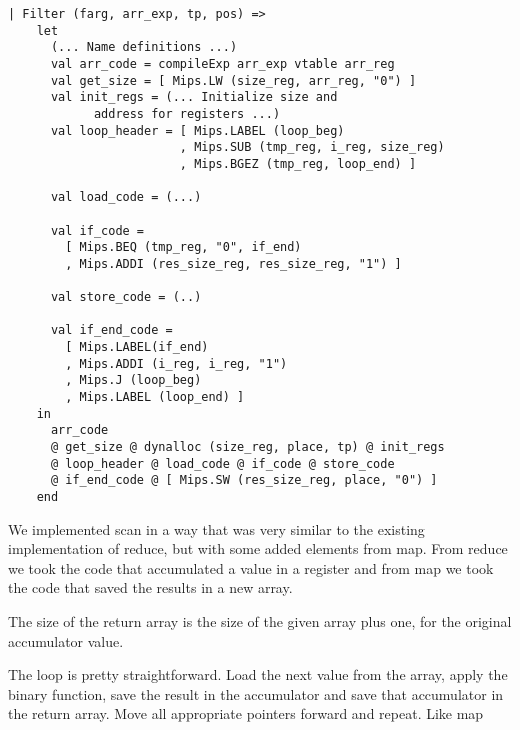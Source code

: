 \documentclass[10pt]{article}
\begin{document}
\begin{Verbatim}[frame=single]
  | Filter (farg, arr_exp, tp, pos) =>
    let
      (... Name definitions ...)
      val arr_code = compileExp arr_exp vtable arr_reg
      val get_size = [ Mips.LW (size_reg, arr_reg, "0") ]
      val init_regs = (... Initialize size and 
      		address for registers ...)
      val loop_header = [ Mips.LABEL (loop_beg)
                        , Mips.SUB (tmp_reg, i_reg, size_reg)
                        , Mips.BGEZ (tmp_reg, loop_end) ]
  
      val load_code = (...)
  
      val if_code =
        [ Mips.BEQ (tmp_reg, "0", if_end)
        , Mips.ADDI (res_size_reg, res_size_reg, "1") ]
  
      val store_code = (..)
      			  
      val if_end_code =
        [ Mips.LABEL(if_end)
        , Mips.ADDI (i_reg, i_reg, "1")
        , Mips.J (loop_beg)
        , Mips.LABEL (loop_end) ]
    in
      arr_code
      @ get_size @ dynalloc (size_reg, place, tp) @ init_regs
      @ loop_header @ load_code @ if_code @ store_code
      @ if_end_code @ [ Mips.SW (res_size_reg, place, "0") ]
    end
\end{Verbatim}

We implemented scan in a way that was very similar to the existing implementation of reduce, but with some added elements from map. From reduce we took the code that accumulated a value in a register and from map we took the code that saved the results in a new array.

The size of the return array is the size of the given array plus one, for the original accumulator value.

The loop is pretty straightforward. Load the next value from the array, apply the binary function, save the result in the accumulator and save that accumulator in the return array. Move all appropriate pointers forward and repeat. Like map
\end{document}
